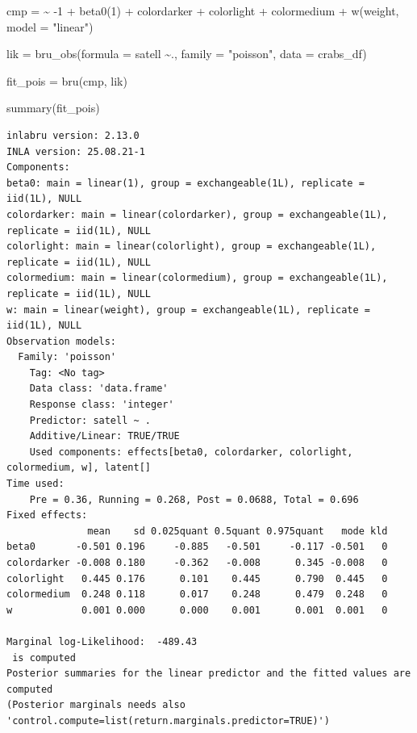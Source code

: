 \documentclass[
  letterpaper,
  DIV=11,
  numbers=noendperiod]{scrartcl}
\newenvironment{Shaded}{\begin{snugshade}}{\end{snugshade}}
\newcommand{\AttributeTok}[1]{\textcolor[rgb]{0.40,0.45,0.13}{#1}}
\newcommand{\DecValTok}[1]{\textcolor[rgb]{0.68,0.00,0.00}{#1}}
\newcommand{\ErrorTok}[1]{\textcolor[rgb]{0.68,0.00,0.00}{#1}}
\newcommand{\FunctionTok}[1]{\textcolor[rgb]{0.28,0.35,0.67}{#1}}
\newcommand{\NormalTok}[1]{\textcolor[rgb]{0.00,0.23,0.31}{#1}}
\newcommand{\OtherTok}[1]{\textcolor[rgb]{0.00,0.23,0.31}{#1}}
\newcommand{\SpecialCharTok}[1]{\textcolor[rgb]{0.37,0.37,0.37}{#1}}
\newcommand{\StringTok}[1]{\textcolor[rgb]{0.13,0.47,0.30}{#1}}
\begin{document}
\begin{Shaded}
\begin{Highlighting}[]
\NormalTok{cmp }\OtherTok{=}  \ErrorTok{\textasciitilde{}} \SpecialCharTok{{-}}\DecValTok{1} \SpecialCharTok{+} \FunctionTok{beta0}\NormalTok{(}\DecValTok{1}\NormalTok{) }\SpecialCharTok{+}\NormalTok{  colordarker }\SpecialCharTok{+}
\NormalTok{       colorlight }\SpecialCharTok{+}\NormalTok{ colormedium }\SpecialCharTok{+}
       \FunctionTok{w}\NormalTok{(weight, }\AttributeTok{model =} \StringTok{"linear"}\NormalTok{)}

\NormalTok{lik }\OtherTok{=}  \FunctionTok{bru\_obs}\NormalTok{(}\AttributeTok{formula =}\NormalTok{ satell }\SpecialCharTok{\textasciitilde{}}\NormalTok{.,}
            \AttributeTok{family =} \StringTok{"poisson"}\NormalTok{,}
            \AttributeTok{data =}\NormalTok{ crabs\_df)}

\NormalTok{fit\_pois }\OtherTok{=} \FunctionTok{bru}\NormalTok{(cmp, lik)}

\FunctionTok{summary}\NormalTok{(fit\_pois)}
\end{Highlighting}
\end{Shaded}

\begin{verbatim}
inlabru version: 2.13.0
INLA version: 25.08.21-1
Components:
beta0: main = linear(1), group = exchangeable(1L), replicate = iid(1L), NULL
colordarker: main = linear(colordarker), group = exchangeable(1L), replicate = iid(1L), NULL
colorlight: main = linear(colorlight), group = exchangeable(1L), replicate = iid(1L), NULL
colormedium: main = linear(colormedium), group = exchangeable(1L), replicate = iid(1L), NULL
w: main = linear(weight), group = exchangeable(1L), replicate = iid(1L), NULL
Observation models:
  Family: 'poisson'
    Tag: <No tag>
    Data class: 'data.frame'
    Response class: 'integer'
    Predictor: satell ~ .
    Additive/Linear: TRUE/TRUE
    Used components: effects[beta0, colordarker, colorlight, colormedium, w], latent[]
Time used:
    Pre = 0.36, Running = 0.268, Post = 0.0688, Total = 0.696 
Fixed effects:
              mean    sd 0.025quant 0.5quant 0.975quant   mode kld
beta0       -0.501 0.196     -0.885   -0.501     -0.117 -0.501   0
colordarker -0.008 0.180     -0.362   -0.008      0.345 -0.008   0
colorlight   0.445 0.176      0.101    0.445      0.790  0.445   0
colormedium  0.248 0.118      0.017    0.248      0.479  0.248   0
w            0.001 0.000      0.000    0.001      0.001  0.001   0

Marginal log-Likelihood:  -489.43 
 is computed 
Posterior summaries for the linear predictor and the fitted values are computed
(Posterior marginals needs also 'control.compute=list(return.marginals.predictor=TRUE)')
\end{verbatim}
\end{document}
